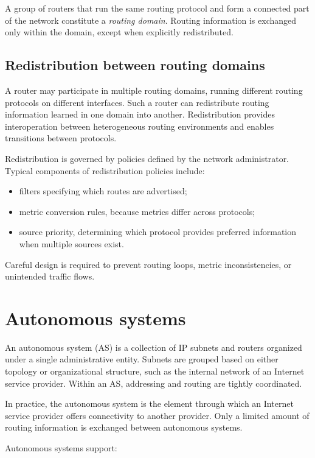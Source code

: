 A group of routers that run the same routing protocol and form a connected part of the network constitute a \emph{routing domain}. Routing information is exchanged only within the domain, except when explicitly redistributed.

\subsection{Redistribution between routing domains}

A router may participate in multiple routing domains, running different routing protocols on different interfaces. Such a router can redistribute routing information learned in one domain into another. Redistribution provides interoperation between heterogeneous routing environments and enables transitions between protocols.

Redistribution is governed by policies defined by the network administrator. Typical components of redistribution policies include:

\begin{itemize}
\item filters specifying which routes are advertised;
\item metric conversion rules, because metrics differ across protocols;
\item source priority, determining which protocol provides preferred information when multiple sources exist.
\end{itemize}

Careful design is required to prevent routing loops, metric inconsistencies, or unintended traffic flows.

\section{Autonomous systems}

An autonomous system (AS) is a collection of IP subnets and routers organized under a single administrative entity. Subnets are grouped based on either topology or organizational structure, such as the internal network of an Internet service provider. Within an AS, addressing and routing are tightly coordinated.

In practice, the autonomous system is the element through which an Internet
service provider offers connectivity to another provider. Only a limited amount
of routing information is exchanged between autonomous systems.

Autonomous systems support:

